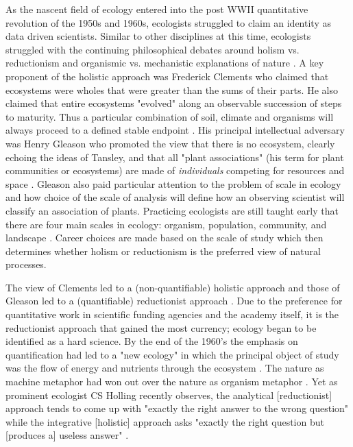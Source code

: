 As the nascent field of ecology entered into the post WWII quantitative revolution of the 1950s and 1960s, ecologists struggled to claim an identity as data driven scientists. Similar to other disciplines at this time, ecologists struggled with the continuing philosophical debates around holism vs. reductionism and organismic vs. mechanistic explanations of nature \citep{barbour_1996}. A key proponent of the holistic approach was Frederick Clements who claimed that ecosystems were wholes that were greater than the sums of their parts. He also claimed that entire ecosystems "evolved" along an observable succession of steps to maturity. Thus a particular combination of soil, climate and organisms will always proceed to a defined stable endpoint \citep{clements_1936}. His principal intellectual adversary was Henry Gleason who promoted the view that there is no ecosystem, clearly echoing the ideas of Tansley, and that all "plant associations" (his term for plant communities or ecosystems) are made of \textit{individuals} competing for resources and space \citep{gleason_1939}.  Gleason also paid particular attention to the problem of scale in ecology and how choice of the scale of analysis will define how an observing scientist will classify an association of plants. Practicing ecologists are still taught early that there are four main scales in ecology: organism, population, community, and landscape \citep{odum_1953}. Career choices are made based on the scale of study which then determines whether holism or reductionism is the preferred view of natural processes.

The view of Clements led to a (non-quantifiable) holistic approach and those of Gleason led to a (quantifiable) reductionist approach \citep{barbour_1996,worster_1977}. Due to the preference for quantitative work in scientific funding agencies and the academy itself, it is the reductionist approach that gained the most currency; ecology began to be identified as a hard science. By the end of the 1960's the emphasis on quantification had led to a "new ecology" in which the principal object of study was the flow of energy and nutrients through the ecosystem \citep{worster_1977,barbour_1996}. The nature as machine metaphor had won out over the nature as organism metaphor \citep{hagen_1992}. Yet as prominent ecologist CS Holling recently observes, the analytical [reductionist] approach tends to come up with "exactly the right answer to the wrong question" while the integrative [holistic] approach asks "exactly the right question but [produces a] useless answer" \citep[][p. 3]{holling_1998}.

